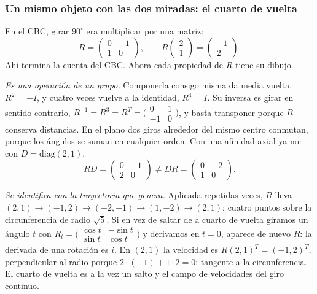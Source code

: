 \subsubsection*{Un mismo objeto con las dos miradas: el cuarto de vuelta}

En el CBC, girar \(90^\circ\) era multiplicar por una matriz:
\[
  R=\begin{pmatrix}0&-1\\1&0\end{pmatrix},\qquad
  R\begin{pmatrix}2\\1\end{pmatrix}=\begin{pmatrix}-1\\2\end{pmatrix}.
\]
Ahí termina la cuenta del CBC. Ahora cada propiedad de \(R\) tiene su dibujo.

\emph{Es una operación de un grupo.} Componerla consigo misma da media vuelta,
\(R^2=-I\), y cuatro veces vuelve a la identidad, \(R^4=I\). Su inversa es girar en sentido
contrario, \(R^{-1}=R^3=R^T=\bigl(\begin{smallmatrix}0&1\\-1&0\end{smallmatrix}\bigr)\), y
basta transponer porque \(R\) conserva distancias. En el plano dos giros alrededor del mismo
centro conmutan, porque los ángulos se suman en cualquier orden. Con una afinidad axial ya
no: con \(D=\mathrm{diag}(2,1)\),
\[
  RD=\begin{pmatrix}0&-1\\2&0\end{pmatrix}\neq
  DR=\begin{pmatrix}0&-2\\1&0\end{pmatrix}.
\]

\emph{Se identifica con la trayectoria que genera.} Aplicada repetidas veces, \(R\) lleva
\((2,1)\to(-1,2)\to(-2,-1)\to(1,-2)\to(2,1)\): cuatro puntos sobre la circunferencia de
radio \(\sqrt5\). Si en vez de saltar de a cuarto de vuelta giramos un ángulo \(t\) con
\(R_t=\bigl(\begin{smallmatrix}\cos t&-\sin t\\ \sin t&\cos t\end{smallmatrix}\bigr)\) y
derivamos en \(t=0\), aparece de nuevo \(R\): la derivada de una
rotación es \(i\). En \((2,1)\) la velocidad es \(R(2,1)^T=(-1,2)^T\),
perpendicular al radio porque \(2\cdot(-1)+1\cdot2=0\): tangente a la circunferencia. El
cuarto de vuelta es a la vez un salto y el campo de velocidades del giro continuo.

